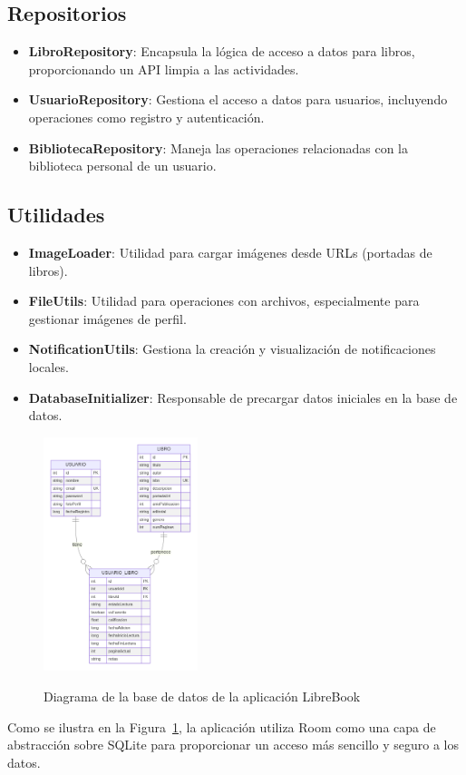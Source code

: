 \documentclass[a4paper,12pt]{report}
\begin{document}
      \subsection{Repositorios}
      \begin{itemize}
        \item \textbf{LibroRepository}: Encapsula la lógica de acceso a datos para libros, proporcionando un API limpia a las actividades.
        \item \textbf{UsuarioRepository}: Gestiona el acceso a datos para usuarios, incluyendo operaciones como registro y autenticación.
        \item \textbf{BibliotecaRepository}: Maneja las operaciones relacionadas con la biblioteca personal de un usuario.
      \end{itemize}
      \subsection{Utilidades}
      \begin{itemize}
        \item \textbf{ImageLoader}: Utilidad para cargar imágenes desde URLs (portadas de libros).
        \item \textbf{FileUtils}: Utilidad para operaciones con archivos, especialmente para gestionar imágenes de perfil.
        \item \textbf{NotificationUtils}: Gestiona la creación y visualización de notificaciones locales.
        \item \textbf{DatabaseInitializer}: Responsable de precargar datos iniciales en la base de datos.
      \end{itemize}
      \begin{figure}[H]
        \centering
        \href{https://raw.githubusercontent.com/Xabierland/DAS-Proyecto/refs/heads/main/Documentation/.img/diagrama-bd.svg}{%
          \includegraphics[width=0.4\textwidth]{.img/diagrama-bd.png}
        }
        \caption{Diagrama de la base de datos de la aplicación LibreBook}
        \label{fig:diagrama-bd}
      \end{figure}
      Como se ilustra en la Figura~\ref{fig:diagrama-bd}, la aplicación utiliza Room como una capa de abstracción sobre SQLite para proporcionar un acceso más sencillo y seguro a los datos\cite{sqlite_android}.
\end{document}
